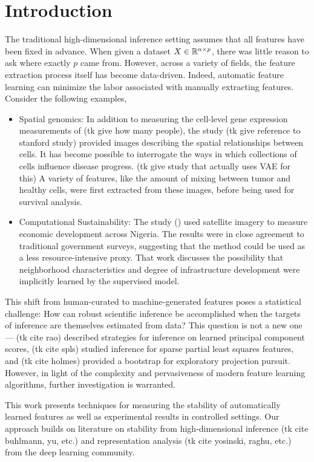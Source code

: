 \section{Introduction}

The traditional high-dimensional inference setting assumes that all features have been fixed in advance. When given a dataset $X \in \mathbb{R}^{n \times p}$, there was little reason to ask where exactly $p$ came from. However, across a variety of fields, the feature extraction process itself has become data-driven. Indeed, automatic feature learning can minimize the labor associated with manually extracting features. Consider the following examples,

\begin{itemize}
\item Spatial genomics: In addition to measuring the cell-level gene expression measurements of (tk give how many people), the study (tk give reference to stanford study) provided images describing the spatial relationships between cells. It has become possible to interrogate the ways in which collections of cells influence disease progress. (tk give study that actually uses VAE for this) A variety of features, like the amount of mixing between tumor and healthy cells, were first extracted from these images, before being used for survival analysis.
\item Computational Sustainability: The study () used satellite imagery to measure economic development across Nigeria. The results were in close agreement to traditional government surveys, suggesting that the method could be used as a less resource-intensive proxy. That work discusses the possibility that neighborhood characteristics and degree of infrastructure development were implicitly learned by the supervised model.
\end{itemize}

This shift from human-curated to machine-generated features poses a statistical challenge: How can robust scientific inference be accomplished when the targets of inference are themselves estimated from data? This question is not a new one — (tk cite rao) described strategies for inference on learned principal component scores, (tk cite spls) studied inference for sparse partial least squares features, and (tk cite holmes) provided a bootstrap for exploratory projection pursuit. However, in light of the complexity and pervasiveness of modern feature learning algorithms, further investigation is warranted.

This work presents techniques for measuring the stability of automatically learned features as well as experimental results in controlled settings. Our approach builds on literature on stability from high-dimensional inference (tk cite buhlmann, yu, etc.) and representation analysis (tk cite yosinski, raghu, etc.) from the deep learning community.

